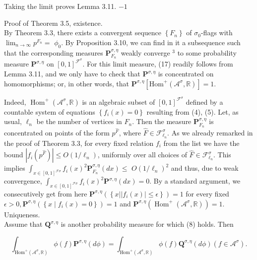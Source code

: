 \documentclass[10pt]{article}
\begin{document}
Taking the limit proves Lemma 3.11. $-1$

Proof of Theorem 3.5, existence.\\
By Theorem 3.3, there exists a convergent sequence $\left\{F_{n}\right\}$ of $\sigma_{0}$-flags with $\lim _{n \rightarrow \infty} p^{F_{n}}=$ $\phi_{0}$. By Proposition 3.10, we can find in it a subsequence such that the corresponding measures $\mathbf{P}_{F_{n}}^{\sigma, \eta}$ weakly converge ${ }^{3}$ to some probability measure $\mathbf{P}^{\sigma, \eta}$ on $[0,1]^{\mathcal{F}^{\sigma}}$. For this limit measure, (17) readily follows from Lemma 3.11, and we only have to check that $\mathbf{P}^{\sigma, \eta}$ is concentrated on homomorphisms; or, in other words, that $\mathbf{P}^{\sigma, \eta}\left[\mathrm{Hom}^{+}\left(\mathcal{A}^{\sigma}, \mathbb{R}\right)\right]=1$.

Indeed, $\operatorname{Hom}^{+}\left(\mathcal{A}^{\sigma}, \mathbb{R}\right)$ is an algebraic subset of $[0,1]^{\mathcal{F}^{\sigma}}$ defined by a countable system of equations $\left\{f_{i}(x)=0\right\}$ resulting from (4), (5). Let, as usual, $\ell_{n}$ be the number of vertices in $F_{n}$. Then the measure $\mathbf{P}_{F_{n}}^{\sigma, \eta}$ is concentrated on points of the form $p^{\widehat{F}}$, where $\widehat{F} \in \mathcal{F}_{\ell_{n}}^{\sigma}$. As we already remarked in the proof of Theorem 3.3, for every fixed relation $f_{i}$ from the list we have the bound $\left|f_{i}\left(p^{\widehat{F}}\right)\right| \leq O\left(1 / \ell_{n}\right)$, uniformly over all choices of $\widehat{F} \in \mathcal{F}_{\ell_{n}}^{\sigma}$. This implies $\int_{x \in[0,1]^{\mathcal{F} \sigma}} f_{i}(x)^{2} \mathbf{P}_{F_{n}}^{\sigma, \eta}(d x) \leq$ $O\left(1 / \ell_{n}\right)^{2}$ and thus, due to weak convergence, $\int_{x \in[0,1]^{\mathcal{F} \sigma}} f_{i}(x)^{2} \mathbf{P}^{\sigma, \eta}(d x)=0$. By a standard argument, we consecutively get from here $\mathbf{P}^{\sigma, \eta}\left(\left\{x| | f_{i}(x) \mid \leq \epsilon\right\}\right)=1$ for every fixed $\epsilon>0, \mathbf{P}^{\sigma, \eta}\left(\left\{x \mid f_{i}(x)=0\right\}\right)=1$ and $\mathbf{P}^{\sigma, \eta}\left(\operatorname{Hom}^{+}\left(\mathcal{A}^{\sigma}, \mathbb{R}\right)\right)=1$.\\
Uniqueness.\\
Assume that $\mathbf{Q}^{\sigma, \eta}$ is another probability measure for which (8) holds. Then


\begin{equation*}
\int_{\mathrm{Hom}^{+}\left(\mathcal{A}^{\sigma}, \mathbb{R}\right)} \phi(f) \mathbf{P}^{\sigma, \eta}(d \phi)=\int_{\mathrm{Hom}^{+}\left(\mathcal{A}^{\sigma}, \mathbb{R}\right)} \phi(f) \mathbf{Q}^{\sigma, \eta}(d \phi)\left(f \in \mathcal{A}^{\sigma}\right) . \tag{20}
\end{equation*}
\end{document}
